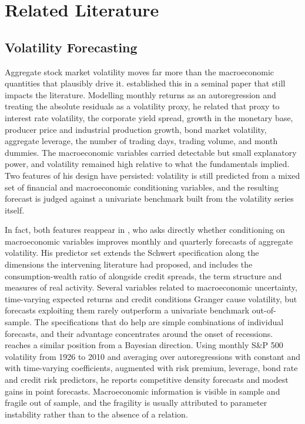 \documentclass[preprint,12pt,authoryear]{elsarticle}
\begin{document}
\section{Related Literature}
\label{sec:literature}

\subsection{Volatility Forecasting}

Aggregate stock market volatility moves far more than the macroeconomic quantities that plausibly drive it. \citet{schwert1989} established this in a seminal paper that still impacts the literature. Modelling monthly returns as an
autoregression and treating the absolute residuals as a volatility proxy, he related that proxy to interest rate volatility, the corporate yield spread, growth in the monetary base, producer price and industrial production growth, bond market volatility, aggregate leverage, the number of trading days, trading volume, and month dummies. The macroeconomic variables carried detectable but small explanatory power, and volatility remained high relative to what the fundamentals implied. Two features of his design have persisted: volatility is still predicted from a mixed set of financial and macroeconomic conditioning variables, and the resulting forecast is judged against a univariate benchmark built from the volatility series itself.

In fact, both features reappear in \citet{paye2012}, who asks directly whether conditioning on macroeconomic variables improves monthly and quarterly forecasts of aggregate volatility. His predictor set extends the Schwert specification
along the dimensions the intervening literature had proposed, and includes the consumption-wealth ratio of \citet{lettauludvigson2001} alongside credit spreads, the term structure and measures of real activity. Several variables
related to macroeconomic uncertainty, time-varying expected returns and credit conditions Granger cause volatility, but forecasts exploiting them rarely outperform a univariate benchmark out-of-sample. The specifications that do help
are simple combinations of individual forecasts, and their advantage concentrates around the onset of recessions.
\citet{nonejad2017} reaches a similar position from a Bayesian direction. Using monthly S\&P 500 volatility from 1926 to 2010 and averaging over autoregressions with constant and with time-varying coefficients, augmented with risk premium, leverage, bond rate and credit risk predictors, he reports
competitive density forecasts and modest gains in point forecasts.  Macroeconomic information is visible in sample and fragile out of sample, and the fragility is usually attributed to parameter instability rather than to the absence of a relation.
\end{document}
